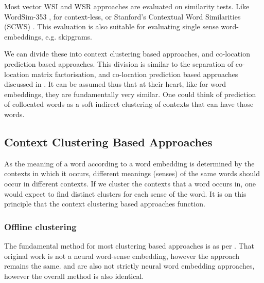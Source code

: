 \documentclass[12pt,parskip]{komatufte}
\begin{document}
Most vector WSI and WSR approaches are evaluated on similarity tests.
Like WordSim-353 \textcite{WordSim353}, for context-less, or Stanford's Contextual Word Similarities (SCWS) \textcite{Huang2012}.
This evaluation is also suitable for evaluating single sense word-embeddings, e.g. skipgrams.


We can divide these into context clustering based approaches,
and co-location prediction based approaches.
This division is similar to the separation of co-location matrix factorisation,
and co-location prediction based approaches discussed in .
It can be assumed thus that at their heart, like for word embeddings,
they are fundamentally very similar.
One could think of prediction of collocated words as a soft indirect clustering of contexts that can have those words.


\subsection{Context Clustering Based Approaches}
As the meaning of a word according to a word embedding is determined by the contexts in which it occurs, different meanings (senses) of the same words should occur in different contexts.
If we cluster the contexts that a word occurs in, one would expect to find distinct clusters for each sense of the word.
It is on this principle that the context clustering based approaches function.



\subsubsection{Offline clustering}
The fundamental method for most clustering based approaches is as per .
That original work is not a neural word-sense embedding, however the approach remains the same.
 and  are also not strictly neural word embedding approaches, however the overall method is also identical.


\end{document}
